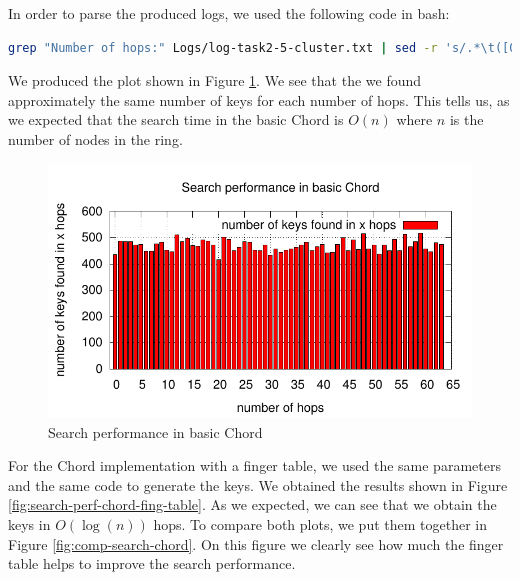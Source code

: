 \documentclass[a4paper, 11pt]{article}
\theoremstyle{plain}
\theoremstyle{definition}
\begin{document}
    

   
    In order to parse the produced logs, we used the following code in bash:
\begin{lstlisting}[style=luaCode, language=bash, caption=Parser for the logs]
grep "Number of hops:" Logs/log-task2-5-cluster.txt | sed -r 's/.*\t([0-9]{1,2})$/\1/g' | sort -n | uniq -c | sed -r 's/ +([0-9]+)/\2 \1/g' >> ParsedLogs/log-task2-5-cluster.txt
\end{lstlisting}
    
    We produced the plot shown in Figure \ref{fig:search-basic-chord}. We see that the we found approximately
    the same number of keys for each number of hops. This tells us, as we expected that the search time in the
    basic Chord is $O(n)$ where $n$ is the number of nodes in the ring. 


    \begin{figure}[h]
      \centering
      \includegraphics{plots/task2-2-cluster.pdf}
      \caption{Search performance in basic Chord}
      \label{fig:search-basic-chord}
    \end{figure}

    

    For the Chord implementation with a finger table, we used the same parameters and the same code to generate the keys. We
    obtained the results shown in Figure \ref{fig:search-perf-chord-fing-table}. As we expected, we can see
    that we obtain the keys in $O(\log(n))$ hops. To compare both plots, we put them together in Figure
    \ref{fig:comp-search-chord}. On this figure we clearly see how much the finger table helps to improve the
    search performance.
\end{document}
